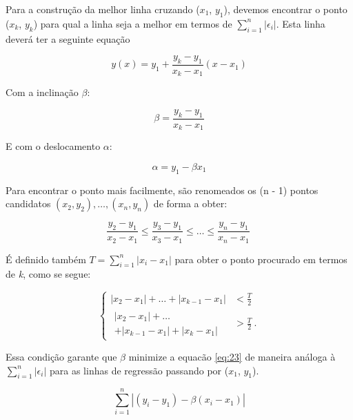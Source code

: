 Para a construção da melhor linha cruzando ($x_1$, $y_1$), devemos encontrar o ponto ($x_k$, $y_k$) para qual a linha seja a melhor em termos de $\sum_{i=1}^{n}|\epsilon_{i}|$. Esta linha deverá ter a seguinte equação

\begin{equation}\label{eq:19}
y(x) = y_1 + \frac{y_k - y_1}{x_k - x_1} (x - x_1)
\end{equation}

Com a inclinação $\beta$:

\begin{equation}\label{eq:20}
\beta = \frac{y_k - y_1}{x_k - x_1}
\end{equation}

E com o deslocamento $\alpha$:

\begin{equation}\label{eq:21}
\alpha = y_1 - \beta x_1
\end{equation}

Para encontrar o ponto mais facilmente, são renomeados os (n - 1) pontos candidatos ${ \left(x_2,
	y_2\right), \ldots, \left(x_n,y_n\right) }$ de forma a obter:
	
\begin{equation*}
    \frac{y_2-y_1}{x_2-x_1} \leq \frac{y_3-y_1}{x_3-x_1}\leq \ldots \leq \frac{y_n-y_1}{x_n-x_1}\:
\end{equation*}

É definido também ${ T=\sum\limits_{i=1}^n \left|x_i-x_1\right| }$ para obter o ponto procurado em termos de \textit{k}, como se segue:

\begin{equation}\label{eq:22}
\begin{cases}
    \left|x_2-x_1\right| + \ldots + \left|x_{k-1}-x_1\right| & < \frac{T}{2} \\
    \begin{array}{l}\left|x_2-x_1\right| + \ldots \\+ \left|x_{k-1}-x_1\right| + \left|x_k-x_1\right|\end{array} & > \frac{T}{2}\:.
  \end{cases}
\end{equation}

Essa condição garante que $\beta$ minimize a equacão \ref{eq:23} de maneira análoga à $\sum_{i=1}^{n}|\epsilon_{i}|$ para as linhas de regressão passando por ($x_1$, $y_1$).

\begin{equation}\label{eq:23}
\sum_{i=1}^n\left| \left(y_i-y_1\right)-\beta\left(x_i-x_1\right)\right|
\end{equation}

